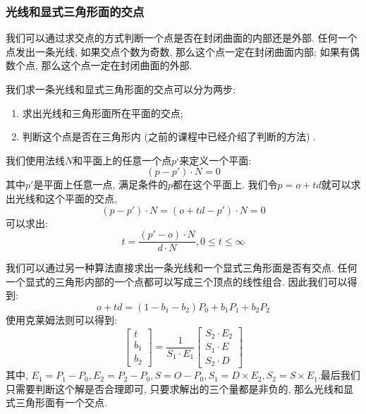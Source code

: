 \subsubsection{光线和显式三角形面的交点}
我们可以通过求交点的方式判断一个点是否在封闭曲面的内部还是外部. 任何一个点发出一条光线, 如果交点个数为奇数, 那么这个点一定在封闭曲面内部; 如果有偶数个点, 那么这个点一定在封闭曲面的外部. 

我们求一条光线和显式三角形面的交点可以分为两步: 
\begin{enumerate}
	\item 求出光线和三角形面所在平面的交点; 
	\item 判断这个点是否在三角形内 (之前的课程中已经介绍了判断的方法) . 
\end{enumerate}

我们使用法线$N$和平面上的任意一个点$p‘$来定义一个平面: 
\begin{equation}
	(p-p')\cdot N = 0
\end{equation}
其中$p'$是平面上任意一点, 满足条件的$p$都在这个平面上. 我们令$p=o+td$就可以求出光线和这个平面的交点, 
\begin{equation}
	(p-p')\cdot N = (o+td-p')\cdot N = 0
\end{equation}
可以求出: 
\begin{equation}
	t = \frac{(p'-o)\cdot N}{d\cdot N}, 0\le t \le \infty
\end{equation}

我们可以通过另一种算法直接求出一条光线和一个显式三角形面是否有交点. 任何一个显式的三角形内部的一个点都可以写成三个顶点的线性组合. 因此我们可以得到: 
\begin{equation}
	o+td=(1-b_1-b_2)P_0+b_1P_1+b_2P_2
\end{equation}使用克莱姆法则可以得到: 
\begin{equation}
	\begin{bmatrix}
		t\\ 
		b_1\\ 
		b_2
	\end{bmatrix}=\frac{1}{S_1\cdot E_1}\begin{bmatrix}
		S_2\cdot E_2\\ 
		S_1\cdot E\\ 
		S_2\cdot D
	\end{bmatrix}
\end{equation}其中, $E_1=P_1-P_0,E_2=P_2-P_0,S=O-P_0,S_1=D\times E_2, S_2=S\times E_1$.最后我们只需要判断这个解是否合理即可, 只要求解出的三个量都是非负的, 那么光线和显式三角形面有一个交点. 

